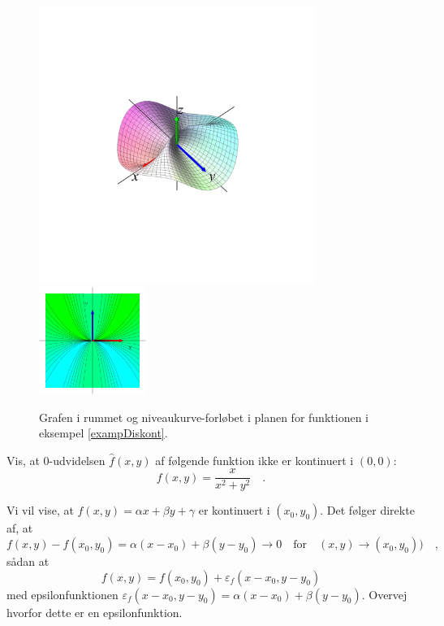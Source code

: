 \begin{figure}[h]
\centerline{\includegraphics[height=90mm]{plotDiskontRes.pdf}\quad \includegraphics[height=35mm]{plotDiskontNiveau.pdf}}
\begin{center}
\caption{Grafen i rummet  og niveaukurve-forløbet i planen for funktionen i eksempel \ref{exampDiskont}.} \label{figDiskont}
\end{center}
\end{figure}

\begin{exercise}
Vis, at $0$-udvidelsen $\widehat{f}(x,y)$ af følgende funktion ikke er kontinuert i $(0,0)$:
\begin{equation}
f(x,y) = \frac{x}{x^{2} + y^{2}} \quad .
\end{equation}
\end{exercise}

\begin{example}
Vi vil vise, at $f(x,y) = \alpha x + \beta y + \gamma$ er kontinuert i $(x_{0}, y_{0})$.
Det følger direkte af, at
\begin{equation}
f(x,y) - f(x_{0}, y_{0}) =  \alpha (x-x_{0}) + \beta (y-y_{0}) \to 0 \quad \textrm{for} \quad (x,y) \to (x_{0}, y_{0})) \quad,
\end{equation}
sådan at
\begin{equation}
f(x,y) = f(x_{0}, y_{0}) + \varepsilon_{f}(x-x_{0}, y-y_{0})
\end{equation}
med epsilonfunktionen $ \varepsilon_{f}(x-x_{0}, y-y_{0}) = \alpha (x-x_{0}) + \beta (y-y_{0})$. Overvej hvorfor dette er en epsilonfunktion.
\end{example}

